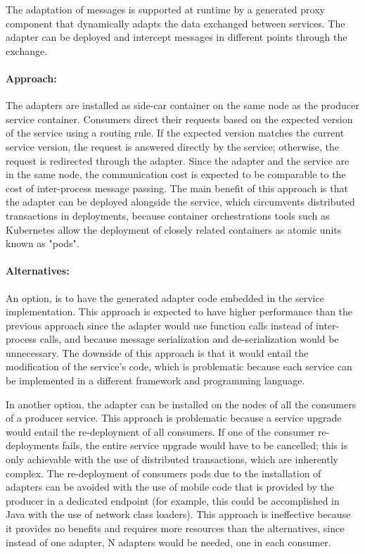 The adaptation of messages is supported at runtime by a generated proxy component
that dynamically adapts the data exchanged between services.
The adapter can be deployed and intercept messages in different points through the exchange.

\paragraph{Approach:}
The adapters are installed as side-car container on the same node as the producer service container.
Consumers direct their requests based on the expected version of the service using a routing rule.
If the expected version matches the current service version, the request is answered directly by the service;
otherwise, the request is redirected through the adapter.
Since the adapter and the service are in the same node, the communication cost is expected to be comparable to the cost of inter-process message passing.
The main benefit of this approach is that the adapter can be deployed alongside the service,
which circumvents distributed transactions in deployments,
because container orchestrations tools such as Kubernetes allow the deployment of closely related containers as atomic units known as "pods".

\paragraph{Alternatives:}
An option, is to have the generated adapter code embedded in the service implementation.
This approach is expected to have higher performance than the previous approach since
the adapter would use function calls instead of inter-process calls, and because message serialization and de-serialization would be unnecessary.
The downside of this approach is that it would entail the modification of the service's code, which is problematic because each service can be implemented in a different framework and programming language.

In another option, the adapter can be installed on the nodes of all the consumers of a producer service.
This approach is problematic because a service upgrade would entail the re-deployment of all consumers.
If one of the consumer re-deployments fails, the entire service upgrade would have to be cancelled;
this is only achievable with the use of distributed transactions, which are inherently complex.
The re-deployment of consumers pods due to the installation of adapters can be avoided with the use of mobile code that is provided by the producer in a dedicated endpoint
(for example, this could be accomplished in Java with the use of network class loaders).
This approach is ineffective because it provides no benefits and requires more resources than the alternatives, since
instead of one adapter, N adapters would be needed, one in each consumer.

